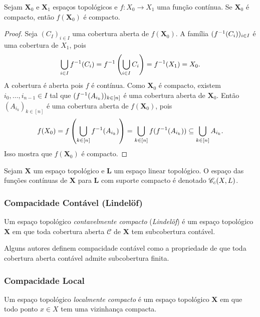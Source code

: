 \begin{prop}
Sejam $\bm X_0$ e $\bm X_1$ espaços topológicos e $f\colon X_0 \to X_1$ uma função contínua. Se $\bm X_0$ é compacto, então $f(\bm X_0)$ é compacto.
\end{prop}
\begin{proof}
Seja $(C_I)_{i \in I}$ uma cobertura aberta de $f(\bm X_0)$. A família $(f^{-1}(C_i))_{i \in I}$ é  uma cobertura de $X_1$, pois
	\begin{equation*}
	\bigcup_{i \in I}f^{-1}(C_i) = f^{-1}\left(\bigcup_{i \in I}C_i\right) = f^{-1}(X_1) = X_0.
	\end{equation*}
A cobertura é aberta pois $f$ é contínua. Como $\bm X_0$ é compacto, existem $i_0, \ldots, i_{n-1} \in I$ tal que $(f^{-1}(A_{i_k}))_{k \in [n]}$ é uma cobertura aberta de $\bm X_0$. Então $(A_{i_k})_{k \in [n]}$ é uma cobertura aberta de $f(\bm X_0)$, pois
	\begin{equation*}
	f(X_0) = f\left(\bigcup_{k \in [n]} f ^{-1}(A_{i_k})\right) = \bigcup_{k \in [n]} f(f^{-1}(A_{i_k})) \subseteq  \bigcup_{k \in [n]} A_{i_k}.
	\end{equation*}
Isso mostra que $f(\bm X_0)$ é compacto.
\end{proof}

\begin{defi}
Sejam $\bm X$ um espaço topológico e $\bm L$ um espaço linear topológico. O espaço das funções contínuas de $\bm X$ para $\bm L$ com suporte compacto é denotado $\mathscr{C}_c(X,L)$.
\end{defi}

\subsubsection{Compacidade Contável (Lindelöf)}

\begin{defi}
Um espaço topológico \emph{contavelmente compacto} (\emph{Lindelöf}) é um espaço topológico $\bm X$ em que toda cobertura aberta $\mathcal C$ de $\bm X$ tem subcobertura contável.
\end{defi}

Alguns autores definem compacidade contável como a propriedade de que toda cobertura aberta contável admite subcobertura finita.

\subsubsection{Compacidade Local}

\begin{defi}
Um espaço topológico \emph{localmente compacto} é um espaço topológico $\bm X$ em que todo ponto $x \in X$ tem uma vizinhança compacta.
\end{defi}

